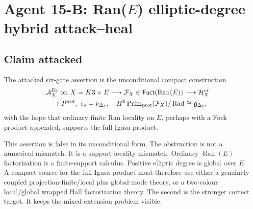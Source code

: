 \section{Agent 15-B: Ran(\(E\)) elliptic-degree hybrid attack--heal}
\label{sec:agent15b-rane-elliptic-degree-hybrid}

\providecommand{\Z}{\mathbb Z}
\providecommand{\C}{\mathbb C}
\providecommand{\Ran}{\operatorname{Ran}}
\providecommand{\Supp}{\operatorname{Supp}}
\providecommand{\Ext}{\operatorname{Ext}}
\providecommand{\RHom}{\operatorname{RHom}}
\providecommand{\Fact}{\mathsf{Fact}}
\providecommand{\CoHA}{\operatorname{CoHA}}
\providecommand{\Hall}{\mathcal H}
\providecommand{\Perf}{\operatorname{Perf}}
\providecommand{\Prim}{\operatorname{Prim}}
\providecommand{\sdim}{\operatorname{sdim}}
\providecommand{\smult}{\operatorname{smult}}
\providecommand{\Spch}{\mathrm{Sp}^{\mathrm{ch}}}
\providecommand{\PhiFA}{\Phi^{\mathrm{FA}}}
\providecommand{\hCS}{\mathrm{hCS}}
\providecommand{\BV}{\mathrm{BV}}
\providecommand{\TS}{\mathrm{TS}}
\providecommand{\gDelta}{\mathfrak g_{\Delta_5}}
\providecommand{\nuDelta}{\nu_{\Delta_5}}
\providecommand{\epsor}{\epsilon_o}
\providecommand{\Mloc}{\mathcal M^{\mathrm{loc}}}
\providecommand{\Mwr}{\mathcal M^{\mathrm{wr}}}
\providecommand{\Mhyb}{\mathcal M^{\mathrm{hyb}}}
\providecommand{\Eloc}{\mathfrak E^{\mathrm{loc}}}
\providecommand{\Ewr}{\mathfrak E^{\mathrm{wr}}}
\providecommand{\Ehyb}{\mathfrak E^{\mathrm{hyb}}}
\providecommand{\Flaghyb}{\mathfrak{Flag}^{\mathrm{hyb}}}
\providecommand{\Den}{\mathsf{Den}}

\subsection{Claim attacked}

The attacked six-gate assertion is the unconditional compact construction
\[
\begin{gathered}
\mathcal A_X^{E_3}\ \hbox{on }X=K3\times E
\longrightarrow
\mathcal F_X\in\Fact(\Ran(E))
\longrightarrow
\Hall_X^{\mathrm{or}}
\\
\longrightarrow
I^{\mathrm{prot}},\ \epsor=\nuDelta,\quad
H^0\Prim_{\mathrm{prot}}(\mathcal F_X)/\operatorname{Rad}
\cong \gDelta ,
\end{gathered}
\]
with the hope that ordinary finite Ran locality on \(E\), perhaps with a
Fock product appended, supports the full Igusa product.

This assertion is false in its unconditional form.  The obstruction is
not a numerical mismatch.  It is a support-locality mismatch.  Ordinary
\(\Ran(E)\) factorization is a finite-support calculus.  Positive
elliptic degree is global over \(E\).  A compact source for the full
Igusa product must therefore use either a genuinely coupled
projection-finite/local plus global-mode theory, or a two-colour
local/global wrapped Hall factorization theory.  The second is the
stronger correct target.  It keeps the mixed extension problem visible.

